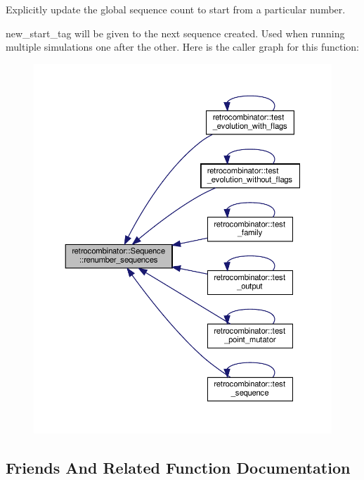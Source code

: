 Explicitly update the global sequence count to start from a particular number. 

new\+\_\+start\+\_\+tag will be given to the next sequence created. Used when running multiple simulations one after the other. Here is the caller graph for this function\+:
\nopagebreak
\begin{figure}[H]
\begin{center}
\leavevmode
\includegraphics[width=350pt]{classretrocombinator_1_1Sequence_ad4791ec3cefbea417081cd349ac6c23b_icgraph}
\end{center}
\end{figure}


\subsection{Friends And Related Function Documentation}
\mbox{\label{classretrocombinator_1_1Sequence_a951eb38b75bb0b9a808e3a8bc7170a09}} 
